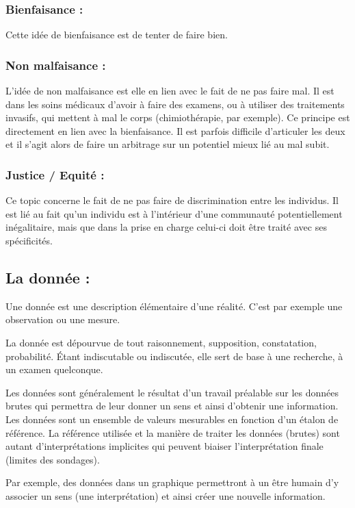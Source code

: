 \documentclass[a4paper,12pt]{article}
\begin{document}
\subsubsection{Bienfaisance : }

Cette idée de bienfaisance est de tenter de faire bien. 


\subsubsection{Non malfaisance : }

L'idée de non malfaisance est elle en lien avec le fait de ne pas faire mal. Il est dans les soins médicaux d'avoir à faire des examens, ou à utiliser des traitements invasifs, qui mettent à mal le corps (chimiothérapie, par exemple). Ce principe est directement en lien avec la bienfaisance. Il est parfois difficile d'articuler les deux et il s'agit alors de faire un arbitrage sur un potentiel mieux lié au mal subit. 


\subsubsection{Justice / Equité : }

Ce topic concerne le fait de ne pas faire de discrimination entre les individus. Il est lié au fait qu'un individu est à l'intérieur d'une communauté potentiellement inégalitaire, mais que dans la prise en charge celui-ci doit être traité avec ses spécificités. 

\subsection{La donnée : }
Une donnée est une description élémentaire d’une réalité. C’est par exemple une observation ou une mesure.

La donnée est dépourvue de tout raisonnement, supposition, constatation, probabilité. Étant indiscutable ou indiscutée, elle sert de base à une recherche, à un examen quelconque.

Les données sont généralement le résultat d'un travail préalable sur les données brutes qui permettra de leur donner un sens et ainsi d'obtenir une information. Les données sont un ensemble de valeurs mesurables en fonction d'un étalon de référence. La référence utilisée et la manière de traiter les données (brutes) sont autant d’interprétations implicites qui peuvent biaiser l’interprétation finale (limites des sondages).

Par exemple, des données dans un graphique permettront à un être humain d'y associer un sens (une interprétation) et ainsi créer une nouvelle information.
\end{document}
